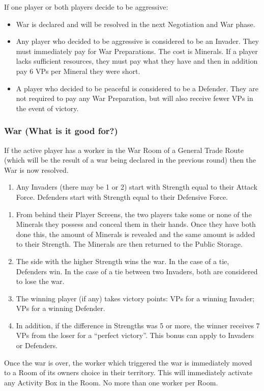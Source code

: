 \documentclass[10pt,twocolumn]{article}
\begin{document}
{\noindent If one player or both players decide to be aggressive:}
\begin{itemize}
\item War is declared and will be resolved in the next Negotiation and War phase.
\item Any player who decided to be aggressive is considered to be an Invader. They must immediately pay for War Preparations. The cost is  Minerals. If a player lacks sufficient resources, they must pay what they have and then in addition pay 6 VPs per Mineral they were short.
\item A player who decided to be peaceful is considered to be a Defender. They are not required to pay any War Preparation, but will also receive fewer VPs in the event of victory.
\end{itemize}

\subsubsection{War (What is it good for?)}
If the active player has a worker in the War Room of a General Trade Route (which will be the result of a war being declared in the previous round) then the War is now resolved.
\begin{enumerate}
\item Any Invaders (there may be 1 or 2) start with Strength equal to their Attack Force. Defenders start with Strength equal to their Defensive Force.
\end{enumerate}
\begin{enumerate}[resume]
\item From behind their Player Screens, the two players take some or none of the Minerals they possess and conceal them in their hands. Once they have both done this, the amount of Minerals is revealed and the same amount is added to their Strength. The Minerals are then returned to the Public Storage.
\item The side with the higher Strength wins the war. In the case of a tie, Defenders win. In the case of a tie between two Invaders, both are considered to lose the war.
\item The winning player (if any) takes victory points:  VPs for a winning Invader;  VPs for a winning Defender.
\item In addition, if the difference in Strengths was 5 or more, the winner receives 7 VPs from the loser for a ``perfect victory''. This bonus can apply to Invaders or Defenders.
\end{enumerate}
Once the war is over, the worker which triggered the war is immediately moved to a Room of its owners choice in their territory. This will immediately activate any Activity Box in the Room. No more than one worker per Room.
\end{document}
